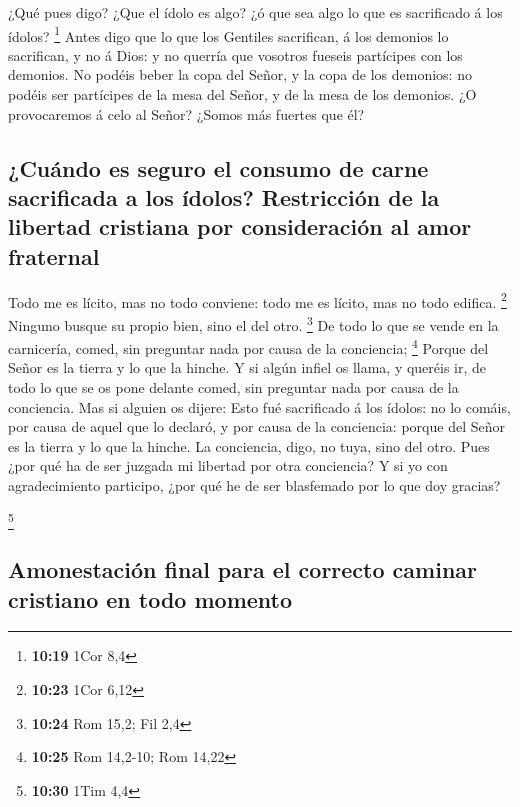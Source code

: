  ¿Qué pues digo? ¿Que el ídolo es algo? ¿ó que sea algo
lo que es sacrificado á los ídolos? \footnote{\textbf{10:19} 1Cor 8,4}
 Antes digo que lo que los Gentiles sacrifican, á los
demonios lo sacrifican, y no á Dios: y no querría que vosotros fueseis
partícipes con los demonios.  No podéis beber la copa del
Señor, y la copa de los demonios: no podéis ser partícipes de la mesa
del Señor, y de la mesa de los demonios.  ¿O provocaremos
á celo al Señor? ¿Somos más fuertes que él?

\hypertarget{cuuxe1ndo-es-seguro-el-consumo-de-carne-sacrificada-a-los-uxeddolos-restricciuxf3n-de-la-libertad-cristiana-por-consideraciuxf3n-al-amor-fraternal}{%
\subsection{¿Cuándo es seguro el consumo de carne sacrificada a los
ídolos? Restricción de la libertad cristiana por consideración al amor
fraternal}\label{cuuxe1ndo-es-seguro-el-consumo-de-carne-sacrificada-a-los-uxeddolos-restricciuxf3n-de-la-libertad-cristiana-por-consideraciuxf3n-al-amor-fraternal}}

 Todo me es lícito, mas no todo conviene: todo me es
lícito, mas no todo edifica. \footnote{\textbf{10:23} 1Cor 6,12}
 Ninguno busque su propio bien, sino el del otro.
\footnote{\textbf{10:24} Rom 15,2; Fil 2,4}  De todo lo
que se vende en la carnicería, comed, sin preguntar nada por causa de la
conciencia; \footnote{\textbf{10:25} Rom 14,2-10; Rom 14,22}
 Porque del Señor es la tierra y lo que la hinche.
 Y si algún infiel os llama, y queréis ir, de todo lo que
se os pone delante comed, sin preguntar nada por causa de la conciencia.
 Mas si alguien os dijere: Esto fué sacrificado á los
ídolos: no lo comáis, por causa de aquel que lo declaró, y por causa de
la conciencia: porque del Señor es la tierra y lo que la hinche.
 La conciencia, digo, no tuya, sino del otro. Pues ¿por
qué ha de ser juzgada mi libertad por otra conciencia?  Y
si yo con agradecimiento participo, ¿por qué he de ser blasfemado por lo
que doy gracias?

\footnote{\textbf{10:30} 1Tim 4,4}

\hypertarget{amonestaciuxf3n-final-para-el-correcto-caminar-cristiano-en-todo-momento}{%
\subsection{Amonestación final para el correcto caminar cristiano en
todo
momento}\label{amonestaciuxf3n-final-para-el-correcto-caminar-cristiano-en-todo-momento}}

